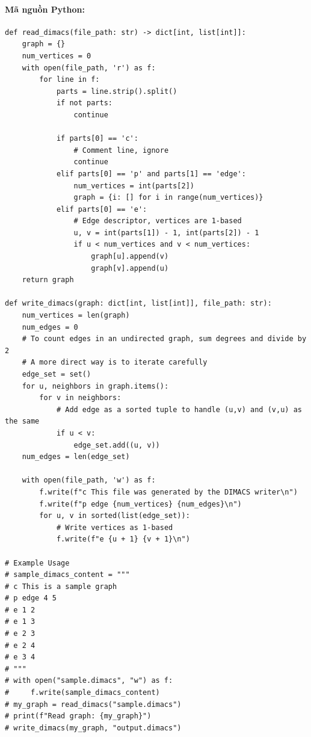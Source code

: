 \documentclass[a4paper,12pt]{article}
\begin{document}
\paragraph{Mã nguồn Python:}
\begin{lstlisting}[style=pythonstyle, caption={Đọc và ghi đồ thị định dạng DIMACS.}]
def read_dimacs(file_path: str) -> dict[int, list[int]]:
    graph = {}
    num_vertices = 0
    with open(file_path, 'r') as f:
        for line in f:
            parts = line.strip().split()
            if not parts:
                continue
            
            if parts[0] == 'c':
                # Comment line, ignore
                continue
            elif parts[0] == 'p' and parts[1] == 'edge':
                num_vertices = int(parts[2])
                graph = {i: [] for i in range(num_vertices)}
            elif parts[0] == 'e':
                # Edge descriptor, vertices are 1-based
                u, v = int(parts[1]) - 1, int(parts[2]) - 1
                if u < num_vertices and v < num_vertices:
                    graph[u].append(v)
                    graph[v].append(u)
    return graph

def write_dimacs(graph: dict[int, list[int]], file_path: str):
    num_vertices = len(graph)
    num_edges = 0
    # To count edges in an undirected graph, sum degrees and divide by 2
    # A more direct way is to iterate carefully
    edge_set = set()
    for u, neighbors in graph.items():
        for v in neighbors:
            # Add edge as a sorted tuple to handle (u,v) and (v,u) as the same
            if u < v:
                edge_set.add((u, v))
    num_edges = len(edge_set)

    with open(file_path, 'w') as f:
        f.write(f"c This file was generated by the DIMACS writer\n")
        f.write(f"p edge {num_vertices} {num_edges}\n")
        for u, v in sorted(list(edge_set)):
            # Write vertices as 1-based
            f.write(f"e {u + 1} {v + 1}\n")

# Example Usage
# sample_dimacs_content = """
# c This is a sample graph
# p edge 4 5
# e 1 2
# e 1 3
# e 2 3
# e 2 4
# e 3 4
# """
# with open("sample.dimacs", "w") as f:
#     f.write(sample_dimacs_content)
# my_graph = read_dimacs("sample.dimacs")
# print(f"Read graph: {my_graph}")
# write_dimacs(my_graph, "output.dimacs")
\end{lstlisting}
\end{document}
